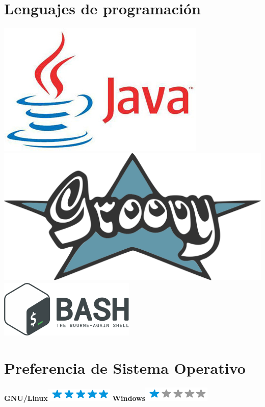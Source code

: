 \documentclass[]{friggeri-cv}
\begin{document}
\begin{aside}
    ~
    ~
    \section{Lenguajes de programaci\'on}
    \includegraphics[scale=0.20]{img/java}
    \includegraphics[scale=0.07]{img/groovy}
    \includegraphics[scale=0.3]{img/bash}
    ~
    ~
    \section{Preferencia de Sistema Operativo}
    \textbf{GNU/Linux}\includegraphics[scale=0.40]{img/5stars.png}
    \textbf{Windows}\includegraphics[scale=0.40]{img/1stars.png}
    ~

\end{aside}
\end{document}
